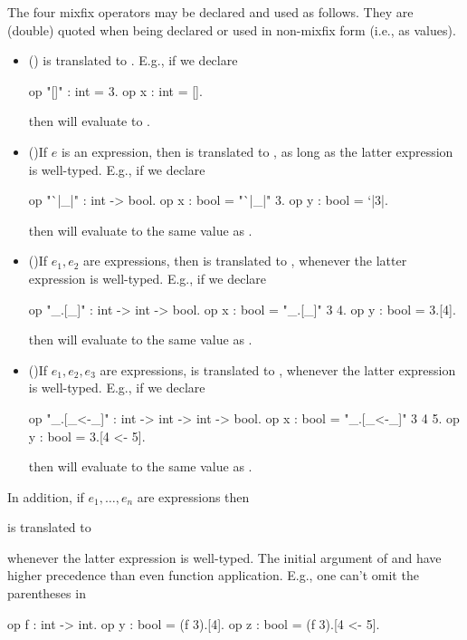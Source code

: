 The four mixfix operators may be declared and used as follows. They
are (double) quoted when being declared or used in non-mixfix form
(i.e., as values).
\begin{itemize}
\item (\ec{[]})\quad \ec{[]} is translated to \ec{\"[]\"}. E.g.,
  if we declare
\begin{easycrypt}{}{}
op "[]" : int = 3.
op x : int = [].
\end{easycrypt}
then  will evaluate to .

\item ()\quad If $e$ is an expression, then  is
  translated to , as long as the latter expression
  is well-typed.  E.g., if we declare
\begin{easycrypt}{}{}
op "`|_|" : int -> bool.
op x : bool = "`|_|" 3.
op y : bool = `|3|.
\end{easycrypt}
then  will evaluate to the same value as .

\item ()\quad If $e_1,e_2$ are expressions, then
     is translated to , whenever the latter expression is well-typed. E.g., if
    we declare
\begin{easycrypt}{}{}
op "_.[_]" : int -> int -> bool.
op x : bool = "_.[_]" 3 4.
op y : bool = 3.[4].
\end{easycrypt}
then  will evaluate to the same value as .

\item ()\quad If $e_1,e_2,e_3$ are expressions,
     is translated to , whenever the latter expression is
    well-typed. E.g., if we declare
\begin{easycrypt}{}{}
op "_.[_<-_]" : int -> int -> int -> bool.
op x : bool = "_.[_<-_]" 3 4 5.
op y : bool = 3.[4 <- 5].
\end{easycrypt}
then  will evaluate to the same value as .
\end{itemize}
In addition, if $e_1,\ldots,e_n$ are expressions then
\begin{center}
\ec{[$e_1$; $\;\ldots\,$; $\,e_n$]}  
\qquad is translated to \qquad
{}
\end{center}
whenever the latter expression is well-typed.
The initial argument of  and  have
higher precedence than even function application. E.g., one
can't omit the parentheses in
\begin{easycrypt}{}{}
op f : int -> int.
op y : bool = (f 3).[4].
op z : bool = (f 3).[4 <- 5].
\end{easycrypt}


